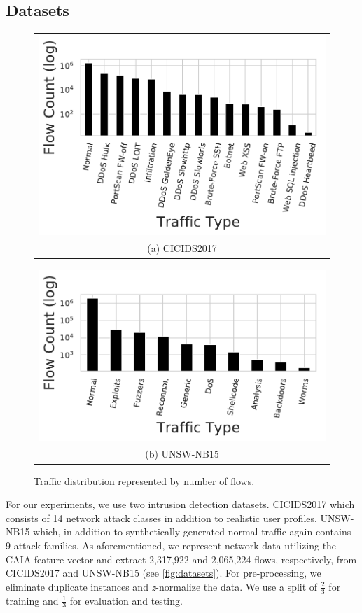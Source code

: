 \documentclass[conference]{IEEEtran}
\begin{document}
\subsection{Datasets}

\begin{figure}[H]
  \centering
  \begin{tabular}{@{}c@{}}
    \includegraphics[width=.8\linewidth]{figures/17_counts.pdf} \\[\abovecaptionskip]
    \small (a) CICIDS2017
  \end{tabular}

  \vspace{0.2cm}

  \begin{tabular}{@{}c@{}}
    \includegraphics[width=.8\linewidth]{figures/15_counts.pdf} \\[\abovecaptionskip]
    \small (b) UNSW-NB15
  \end{tabular}

  \caption{Traffic distribution represented by number of flows.}
  \label{fig:datasets}
\end{figure}

For our experiments, we use two intrusion detection datasets. CICIDS2017 \cite{sharafaldin_toward_2018} which consists of 14 network attack classes in addition to realistic user profiles. UNSW-NB15 \cite{moustafa_unsw-nb15_2015} which, in addition to synthetically generated normal traffic again contains 9 attack families. As aforementioned, we represent network data utilizing the CAIA feature vector and extract 2,317,922 and 2,065,224 flows, respectively, from CICIDS2017 and UNSW-NB15 (see \autoref{fig:datasets}). For pre-processing, we eliminate duplicate instances and \emph{z}-normalize the data. We use a split of $\frac{2}{3}$ for training and $\frac{1}{3}$ for evaluation and testing.
\end{document}
